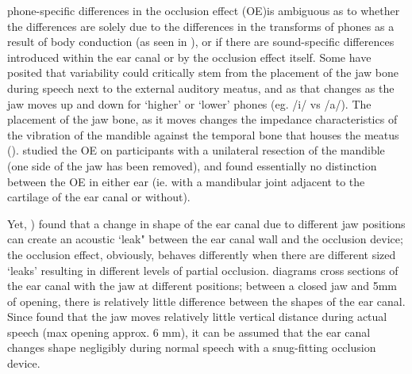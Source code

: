 \DIFdelbegin {}\DIFdelend \DIFaddbegin {}\DIFaddend phone-specific differences in the occlusion effect (OE)\DIFdelbegin {}\DIFdelend \DIFaddbegin {}\DIFaddend is ambiguous as to whether the differences are solely due to the differences in the transforms of phones as a result of body conduction (as seen \DIFaddbegin {}\DIFaddend in \cite{reinfeldt:10}), or if there are sound-specific differences introduced within the ear canal or by the occlusion effect itself.  
Some have posited that variability could critically stem from the placement of the jaw bone during speech next to the external auditory meatus, and as that changes as the jaw moves up and down for `higher' or `lower' phones (eg. /i/ vs /a/). The placement of the jaw bone, as it moves changes the impedance characteristics of the vibration of the mandible against the temporal bone that houses the meatus (\cite{bekesy:60}).  \cite{allen:60} studied the OE on participants with a unilateral resection of the mandible (one side of the jaw has been removed), and found essentially no distinction between the OE in either ear (ie. with a mandibular joint adjacent to the cartilage of the ear canal or without).

Yet, \cite{hansen:97b}) found that a change in shape of the ear canal due to different jaw positions can create an acoustic `leak" between the ear canal wall and the occlusion device; the occlusion effect, obviously, behaves differently when there are different sized `leaks' resulting in different levels of partial occlusion. 
\cite{hansen:97b} diagrams cross sections of the ear canal with the jaw at different positions; between a closed jaw and 5mm of opening, there is relatively little difference between the shapes of the ear canal.  Since \cite{borghese:97} found that the jaw moves relatively little vertical distance during actual speech (max opening approx. 6 mm), it can be assumed that the ear canal changes shape negligibly during normal speech with a snug-fitting occlusion device. 

